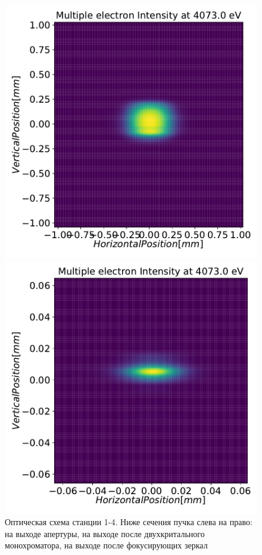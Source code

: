 \begin{figure}[h]
\begin{minipage}{0.3\textwidth}
		\includegraphics[width=\textwidth]{pic/3_harm_after_DCM_2d.pdf}
	\end{minipage} 
	\begin{minipage}{0.3\textwidth}
		\centering
		\includegraphics[width=\textwidth]{pic/3_harm_after_Sph_Mir_2d.pdf}
	\end{minipage} 
	\caption{Оптическая схема станции 1-4. Ниже сечения пучка слева на право: на выходе апертуры, на выходе после двухкритального монохроматора, на выходе после фокусирующих зеркал}
	\label{fig:OptScheme_1-4}  
\end{figure}
